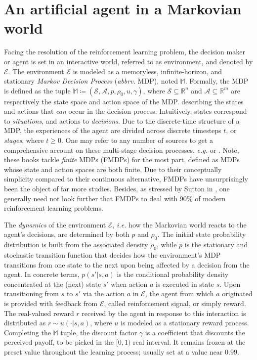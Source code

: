 \section{An artificial agent in a Markovian world}

Facing the resolution of the reinforcement learning problem,
the decision maker or agent is set in an interactive world,
referred to as environment, and denoted by $\mathcal{E}$.
The environment $\mathcal{E}$ is modeled as a memoryless, infinite-horizon, and stationary
\emph{Markov Decision Process} (\textit{abbrv.} MDP), noted $\mathbb{M}$.
Formally, the MDP is defined as the tuple
$\mathbb{M} \coloneqq (\mathcal{S}, \mathcal{A}, p, \rho_0, u, \gamma)$, where
$\mathcal{S} \subseteq \mathbb{R}^n$ and $\mathcal{A} \subseteq \mathbb{R}^m$
are respectively the state space and action space of the MDP.
describing the states and actions that \textit{can} occur in the decision process.
Intuitively, states correspond to \emph{situations}, and actions to \emph{decisions}.
Due to the discrete-time structure of a MDP,
the experiences of the agent are divided across discrete timesteps $t$, or \emph{stages}, where $t\geq0$.
One may refer to any number of sources to get a comprehensive account on these multi-stage decision processes,
\textit{e.g.} \cite{Ross1983-oc} or \cite{Puterman1994-pf}.
Note, these books tackle \textit{finite} MDPs (FMDPs) for the most part,
defined as MDPs whose state and action spaces are both finite.
Due to their conceptually simplicity compared to their continuous alternative, FMDPs
have unsurprisingly been the object of far more studies.
Besides, as stressed by Sutton in \cite{Sutton1998-ow},
one generally need not look further that FMDPs
to deal with 90\% of modern reinforcement learning problems.

The \emph{dynamics} of the environment $\mathcal{E}$,
\textit{i.e.} how the Markovian world reacts to the agent's decisions,
are determined by both $p$ and $\rho_0$.
The initial state probability distribution is built from the associated density $\rho_0$, while
$p$ is the stationary and stochastic transition function that decides how the environment's MDP transitions from
one state to the next upon being affected by a decision from the agent.
In concrete terms, $p(s' | s, a)$ is the conditional probability density
concentrated at the (next) state $s'$ when action $a$ is executed in state $s$.
Upon transitioning from $s$ to $s'$ via the action $a$ in $\mathcal{E}$,
the agent from which $a$ originated is provided with feedback from $\mathcal{E}$,
called reinforcement signal, or simply reward.
The real-valued reward $r$ received by the agent in response to this interaction
is distributed as $r \sim u(\cdot | s, a)$, where $u$ is modeled as a stationary reward process.
Completing the $\mathbb{M}$ tuple,
the discount factor $\gamma$ is a coefficient that discounts the perceived payoff,
to be picked in the $[0, 1)$ real interval.
It remains frozen at the preset value throughout the learning process;
usually set at a value near $0.99$.

